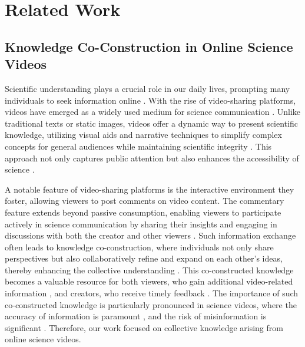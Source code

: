 \section{Related Work}

\subsection{Knowledge Co-Construction in Online Science Videos}
Scientific understanding plays a crucial role in our daily lives, prompting many individuals to seek information online \cite{tabak2015functional, segev2012seeking, brossard2013new, dubovi2020empirical}. With the rise of video-sharing platforms, videos have emerged as a widely used medium for science communication \cite{morcillo2015typologies, welbourne2016science}. Unlike traditional texts or static images, videos offer a dynamic way to present scientific knowledge, utilizing visual aids and narrative techniques to simplify complex concepts for general audiences while maintaining scientific integrity \cite{trumbo1999visual, nicholson2005representing}. This approach not only captures public attention but also enhances the accessibility of science \cite{zhang2023understanding}.

A notable feature of video-sharing platforms is the interactive environment they foster, allowing viewers to post comments on video content. The commentary feature extends beyond passive consumption, enabling viewers to participate actively in science communication by sharing their insights and engaging in discussions with both the creator and other viewers \cite{he2021beyond, wu2018danmaku, lange2007publicly, dubovi2020empirical}. Such information exchange often leads to knowledge co-construction, where individuals not only share perspectives but also collaboratively refine and expand on each other's ideas, thereby enhancing the collective understanding \cite{he2021beyond, dubovi2020empirical, scardamalia2002collective}. This co-constructed knowledge becomes a valuable resource for both viewers, who gain additional video-related information \cite{choi2020finding}, and creators, who receive timely feedback \cite{wu2018danmaku}. The importance of such co-constructed knowledge is particularly pronounced in science videos, where the accuracy of information is paramount \cite{stadtler2007dealing, dubovi2020empirical}, and the risk of misinformation is significant \cite{rosenthal2020media}. Therefore, our work focused on collective knowledge arising from online science videos.

